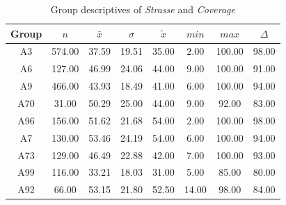 \begin{table}[ht]
	\tiny
	\centering
	\begin{tabular}{c|c|c|c|c|c|c|c}
	  	\toprule
	 	Group & $n$ & $\bar{x}$ & $\sigma$ & $\tilde{x}$ & $min$ & $max$ & $\Delta$ \\   
	  	\midrule
		A3 & 574.00 & 37.59 & 19.51 & 35.00 & 2.00 & 100.00 & 98.00 \\ 
	  	A6 & 127.00 & 46.99 & 24.06 & 44.00 & 9.00 & 100.00 & 91.00 \\ 
	  	A9 & 466.00 & 43.93 & 18.49 & 41.00 & 6.00 & 100.00 & 94.00 \\ 
	  	A70 & 31.00 & 50.29 & 25.00 & 44.00 & 9.00 & 92.00 & 83.00 \\ 
	  	A96 & 156.00 & 51.62 & 21.68 & 54.00 & 2.00 & 100.00 & 98.00 \\ 
	  	A7 & 130.00 & 53.46 & 24.19 & 54.00 & 6.00 & 100.00 & 94.00 \\ 
	  	A73 & 129.00 & 46.49 & 22.88 & 42.00 & 7.00 & 100.00 & 93.00 \\ 
	  	A99 & 116.00 & 33.21 & 18.03 & 31.00 & 5.00 & 85.00 & 80.00 \\ 
	  	A92 & 66.00 & 53.15 & 21.80 & 52.50 & 14.00 & 98.00 & 84.00 \\ 
	  	\bottomrule
	\end{tabular}
	\caption{Group descriptives of \textit{Strasse} and \textit{Coverage}}
	\label{tbl:descriptives_baysis_matched_Strasse_Cov}
\end{table}


